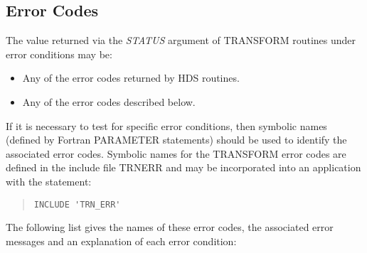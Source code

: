 \documentclass[twoside,11pt]{article}
\newcommand{\xlabel}[1]{}
\renewcommand{\_}{\texttt{\symbol{95}}}
\newcommand{\name}[1]{\mbox{\small{#1}}}
\newcommand{\fortvar}[1]{\mbox{\emph{#1}}}
\begin{document}
\subsection{\xlabel{error_codes}Error Codes}

The value returned via the \fortvar{STATUS} argument of \name{TRANSFORM}
routines under error conditions may be:

\begin{itemize}

\item Any of the error codes returned by \name{HDS} routines.

\item Any of the error codes described below.

\end{itemize}

If it is necessary to test for specific error conditions, then symbolic
names (defined by Fortran \name{PARAMETER} statements) should be used to
identify the associated error codes.
Symbolic names for the \name{TRANSFORM} error codes are defined in the
include file \name{TRN\_ERR} and may be incorporated into an application
with the statement:

\begin{quote}
\begin{verbatim}
INCLUDE 'TRN_ERR'
\end{verbatim}
\end{quote}

The following list gives the names of these error codes, the associated
error messages and an explanation of each error condition:
\end{document}
